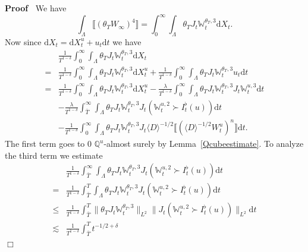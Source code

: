 \documentclass[11pt]{article}
\newcommand{\mathd}{\mathrm{d}}
\newenvironment{proof}{\noindent\textbf{Proof\ }}{\hspace*{\fill}$\Box$\medskip}
\begin{document}
\begin{proof}
  We have
  \[ \int_{\Lambda} \llbracket (\theta_T W_{\infty})^4 \rrbracket =
     \int^{\infty}_0 \int_{\Lambda} \theta_T J_t \mathbb{W}_t^{\theta_T, 3}
     \mathd X_t . \]
  Now since $\mathd X_t = \mathd X_t^u + u_t \mathd t$ we have
  \[ \begin{array}{ll}
       & \frac{1}{T^{1 - \delta}} \int^{\infty}_0 \int_{\Lambda} \theta_T J_t
       \mathbb{W}_t^{\theta_T, 3} \mathd X_t\\
       = & \frac{1}{T^{1 - \delta}} \int^{\infty}_0 \int_{\Lambda} \theta_T
       J_t \mathbb{W}_t^{\theta_T, 3} \mathd X^u_t + \frac{1}{T^{1 - \delta}}
       \int^{\infty}_0 \int_{\Lambda} \theta_T J_t \mathbb{W}_t^{\theta_T, 3}
       u_t \mathd t\\
       = & \frac{1}{T^{1 - \delta}} \int^{\infty}_0 \int_{\Lambda} \theta_T
       J_t \mathbb{W}_t^{\theta_T, 3} \mathd X^u_t - \frac{\lambda}{T^{1 -
       \delta}} \int^{\infty}_0 \int_{\Lambda} \theta_T J_t
       \mathbb{W}_t^{\theta_T, 3} J_t \mathbb{W}_t^{u, 3} \mathd t\\
       & - \frac{\lambda}{T^{1 - \delta}} \int^{\infty}_{\bar{T}}
       \int_{\Lambda} \theta_T J_t \mathbb{W}_t^{\theta_T, 3} J_t
       (\mathbb{W}_t^{u, 2} \succ I^{\flat}_t (u)) \mathd t\\
       & - \frac{1}{T^{1 - \delta}} \int^{\infty}_0 \int_{\Lambda} \theta_T
       J_t \mathbb{W}_t^{\theta_T, 3} J_t \langle D \rangle^{- 1 / 2}
       \llbracket (\langle D \rangle^{- 1 / 2} W^u_t)^n \rrbracket \mathd t.
     \end{array} \]
  The first term goes to $0$ $\mathbb{Q}^u$-almost surely by
  Lemma~\ref{Qcubeestimate}. To analyze the third term we estimate
  \begin{equation}
    \begin{array}{ll}
      & \frac{1}{T^{1 - \delta}} \int^{\infty}_{\bar{T}} \int_{\Lambda}
      \theta_T J_t \mathbb{W}_t^{\theta_T, 3} J_t (\mathbb{W}_t^{u, 2} \succ
      I^{\flat}_t (u)) \mathd t\\
      = & \frac{1}{T^{1 - \delta}} \int^T_{\bar{T}} \int_{\Lambda} \theta_T
      J_t \mathbb{W}_t^{\theta_T, 3} J_t (\mathbb{W}_t^{u, 2} \succ
      I^{\flat}_t (u)) \mathd t\\
      \leqslant & \frac{1}{T^{1 - \delta}} \int^T_{\bar{T}} \| \theta_T J_t
      \mathbb{W}_t^{\theta_T, 3} \|_{L^2} \| J_t (\mathbb{W}_t^{u, 2} \succ
      I^{\flat}_t (u)) \|_{L^2} \mathd t\\
      \lesssim & \frac{1}{T^{1 - \delta}} \int^T_{\bar{T}} t^{- 1 / 2 + \delta
}
\end{array}
\end{equation}
\end{proof}
\end{document}
